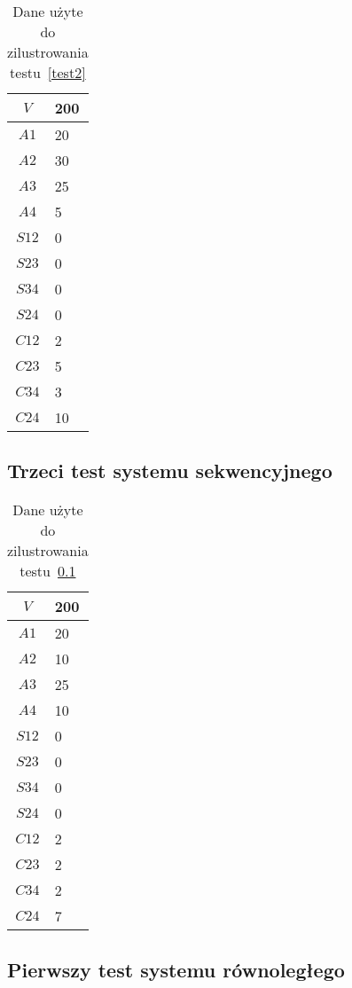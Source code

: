 \begin{table}[H]
\centering
\begin{tabular}{|c|l|}
\hline
$V$ & 200 \\ \hline
$A1$ & 20 \\ \hline
$A2$ & 30 \\ \hline
$A3$ & 25 \\ \hline
$A4$ & 5 \\ \hline
$S12$ & 0 \\ \hline
$S23$ & 0 \\ \hline
$S34$ & 0 \\ \hline
$S24$ & 0 \\ \hline
$C12$ & 2 \\ \hline
$C23$ & 5 \\ \hline
$C34$ & 3 \\ \hline
$C24$ & 10 \\ \hline
\end{tabular}
\caption{Dane użyte do zilustrowania testu~\ref{test2}}
\label{tab:res_2}
\end{table}

\subsection{Trzeci test systemu sekwencyjnego} \label{test3}

\begin{table}[H]
\centering
\begin{tabular}{|c|l|}
\hline
$V$ & 200 \\ \hline
$A1$ & 20 \\ \hline
$A2$ & 10 \\ \hline
$A3$ & 25 \\ \hline
$A4$ & 10 \\ \hline
$S12$ & 0 \\ \hline
$S23$ & 0 \\ \hline
$S34$ & 0 \\ \hline
$S24$ & 0 \\ \hline
$C12$ & 2 \\ \hline
$C23$ & 2 \\ \hline
$C34$ & 2 \\ \hline
$C24$ & 7 \\ \hline
\end{tabular}
\caption{Dane użyte do zilustrowania testu~\ref{test3}}
\label{tab:res_3}
\end{table}

\subsection{Pierwszy test systemu równoległego} \label{test4}

